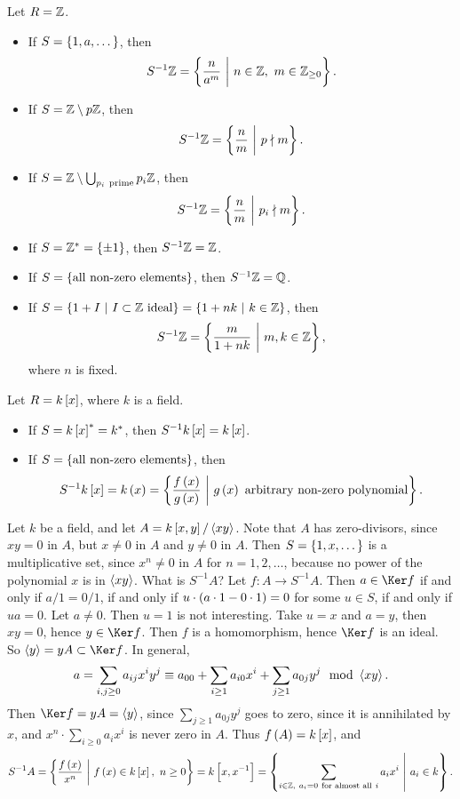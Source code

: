 \begin{example*}
Let $ R = \mathbb{Z} $.
\begin{itemize}
\item If $ S = \cbr{1, a, \dots} $, then
$$ S^{-1}\ZZ = \cbr{\dfrac{n}{a^m} \st n \in \ZZ, \ m \in \ZZ_{\ge 0}}. $$
\item If $ S = \mathbb{Z} \setminus p\mathbb{Z} $, then
$$ S^{-1}\ZZ = \cbr{\dfrac{n}{m} \st p \nmid m}. $$
\item If $ S = \ZZ \setminus \bigcup_{p_i \ \text{prime}} p_i\ZZ $, then
$$ S^{-1}\ZZ = \cbr{\dfrac{n}{m} \st p_i \nmid m}. $$
\item If $ S = \ZZ^* = \cbr{\pm 1} $, then $ S^{-1}\mathbb{Z} = \mathbb{Z} $.
\item If $ S = \cbr{\text{all non-zero elements}} $, then $ S^{-1}\mathbb{Z} = \mathbb{Q} $.
\item If $ S = \cbr{1 + I \st I \subset \ZZ \ \text{ideal}} = \cbr{1 + nk \st k \in \ZZ} $, then
$$ S^{-1}\ZZ = \cbr{\dfrac{m}{1 + nk} \st m, k \in \ZZ}, $$
where $ n $ is fixed.
\end{itemize}
\end{example*}

\begin{example*}
Let $ R = k\sbr{x} $, where $ k $ is a field.
\begin{itemize}
\item If $ S = k\sbr{x}^* = k^* $, then $ S^{-1}k\sbr{x} = k\sbr{x} $.
\item If $ S = \cbr{\text{all non-zero elements}} $, then
$$ S^{-1}k\sbr{x} = k\br{x} = \cbr{\dfrac{f\br{x}}{g\br{x}} \st g\br{x} \ \text{arbitrary non-zero polynomial}}. $$
\end{itemize}
\end{example*}

\begin{example}
Let $ k $ be a field, and let $ A = k\sbr{x, y} / \abr{xy} $. Note that $ A $ has zero-divisors, since $ xy = 0 $ in $ A $, but $ x \ne 0 $ in $ A $ and $ y \ne 0 $ in $ A $. Then $ S = \cbr{1, x, \dots} $ is a multiplicative set, since $ x^n \ne 0 $ in $ A $ for $ n = 1, 2, \dots $, because no power of the polynomial $ x $ is in $ \left\langle xy \right\rangle $. What is $ S^{-1}A $? Let $ f : A \to S^{-1}A $. Then $ a \in \Ker f $ if and only if $ a / 1 = 0 / 1 $, if and only if $ u \cdot \br{a \cdot 1 - 0 \cdot 1} = 0 $ for some $ u \in S $, if and only if $ ua = 0 $. Let $ a \ne 0 $. Then $ u = 1 $ is not interesting. Take $ u = x $ and $ a = y $, then $ xy = 0 $, hence $ y \in \Ker f $. Then $ f $ is a homomorphism, hence $ \Ker f $ is an ideal. So $ \abr{y} = yA \subset \Ker f $. In general,
$$ a = \sum_{i, j \ge 0} a_{ij}x^iy^j \equiv a_{00} + \sum_{i \ge 1} a_{i0}x^i + \sum_{j \ge 1} a_{0j}y^j \mod \abr{xy}. $$
Then $ \Ker f = yA = \abr{y} $, since $ \sum_{j \ge 1} a_{0j}y^j $ goes to zero, since it is annihilated by $ x $, and $ x^n \cdot \sum_{i \ge 0} a_ix^i $ is never zero in $ A $. Thus $ f\br{A} = k\sbr{x} $, and
$$ S^{-1}A = \cbr{\dfrac{f\br{x}}{x^n} \st f\br{x} \in k\sbr{x}, \ n \ge 0} = k\sbr{x, x^{-1}} = \cbr{\sum_{i \in \ZZ, \ a_i = 0 \ \text{for almost all} \ i} a_ix^i \st a_i \in k}. $$
\end{example}

